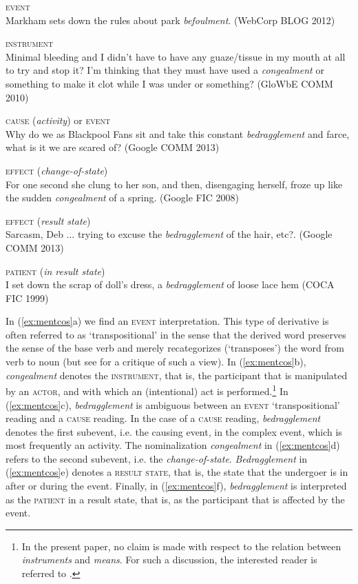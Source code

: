 \documentclass[output=paper]{langsci/langscibook}
\begin{document}
\begin{exe}
	\ex \label{ex:mentcos}
	\begin{xlist}
		\ex \textsc{event}\\
		Markham sets down the rules about park \emph{befoulment}. (WebCorp BLOG 2012)

		\ex \textsc{instrument}\\
		Minimal bleeding and I didn't have to have any guaze/tissue in my mouth at all to try and stop it? I'm thinking that they must have used a \emph{congealment} or something to make it clot while I was under or something? (GloWbE COMM 2010)

		\ex \textsc{cause} (\textit{activity}) or \textsc{event} \\
		Why do we as Blackpool Fans sit and take this constant \emph{bedragglement} and farce, what is it we are scared of? (Google COMM 2013)

		\ex \textsc{effect} (\textit{change-of-state})\\
		For one second she clung to her son, and then, disengaging herself, froze up like the sudden \emph{congealment} of a spring. (Google FIC 2008)

		\ex \textsc{effect} (\textit{result state})\\
		Sarcasm, Deb ... trying to excuse the \emph{bedragglement} of the hair, etc?. (Google COMM 2013)

		\ex \textsc{patient} (\textit{in result state})\\
		I set down the scrap of doll's dress, a \emph{bedragglement} of loose lace hem (COCA FIC 1999)
	\end{xlist}
\end{exe}

In (\ref{ex:mentcos}a) we find an \textsc{event} interpretation. This type of derivative is often referred to as `transpositional' in the sense that the derived word preserves the sense of the base verb and merely recategorizes (`transposes') the word from verb to noun (but see \citet{Lieber.2015} for a critique of such a view). In (\ref{ex:mentcos}b), \textit{congealment} denotes the \textsc{instrument}, that is, the participant that is manipulated by an \textsc{actor}, and with which an (intentional) act is performed.\footnote{In the present paper, no claim is made with respect to the relation between \textit{instruments} and \textit{means}. For such a discussion, the interested reader is referred to \citet{Fradin.2012a}.} In (\ref{ex:mentcos}c), \textit{bedragglement} is ambiguous between an \textsc{event} `transpositional' reading and a \textsc{cause} reading. In the case of a \textsc{cause} reading, \textit{bedragglement} denotes the first subevent, i.e. the causing event, in the complex event, which is most frequently an activity. The nominalization \textit{congealment} in (\ref{ex:mentcos}d) refers to the second subevent, i.e. the \textit{change-of-state}. \textit{Bedragglement} in (\ref{ex:mentcos}e) denotes a \textsc{result state}, that is, the state that the undergoer is in after or during the event. Finally, in (\ref{ex:mentcos}f), \textit{bedragglement} is interpreted as the \textsc{patient} in a result state, that is, as the participant that is affected by the event.
\end{document}

